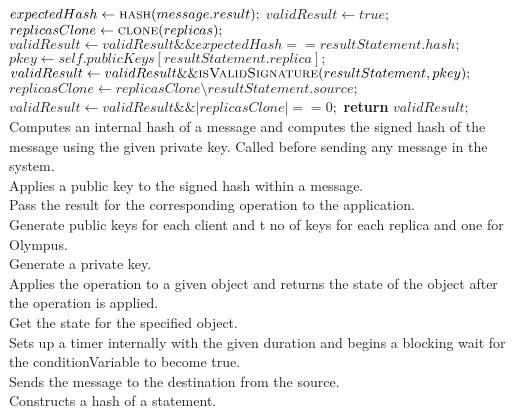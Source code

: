 \begin{algorithmic}[1]
 
    \State $expectedHash \gets \Call{hash}{message.result};$
    \State $validResult \gets true;$
    \State $replicasClone \gets \Call{clone}{replicas};$
        \State $validResult \gets validResult \&\& expectedHash == resultStatement.hash;$
        \State $pkey \gets self.publicKeys[resultStatement.replica];$
        \State $validResult \gets validResult \&\& \Call{isValidSignature}{resultStatement, pkey};$
        \State $replicasClone \gets replicasClone \setminus resultStatement.source;$
    \EndFor
    \State $validResult \gets validResult \&\& |replicasClone| == 0;$
    \State \textbf{return} $validResult;$
\EndFunction
\\

 \Comment Computes an internal hash of a message and computes the signed hash of the message using the given private key. Called before sending any message in the system.
\EndFunction
\\

 \Comment Applies a public key to the signed hash within a message.
\EndFunction
\\

 \Comment Pass the result for the corresponding operation to the application.
\EndFunction
\\

 \Comment Generate public keys for each client and t no of keys for each replica and one for Olympus.
\EndFunction
\\

 \Comment Generate a private key.
\EndFunction
\\

 \Comment Applies the operation to a given object and returns the state of the object after the operation is applied.
\EndFunction
\\

 \Comment Get the state for the specified object.
\EndFunction
\\

 \Comment Sets up a timer internally with the given duration and begins a blocking wait for the conditionVariable to become true.
\EndFunction
\\

 \Comment Sends the message to the destination from the source.
\EndFunction
\\

 \Comment Constructs a hash of a statement.
\EndFunction
\\
\end{algorithmic}
